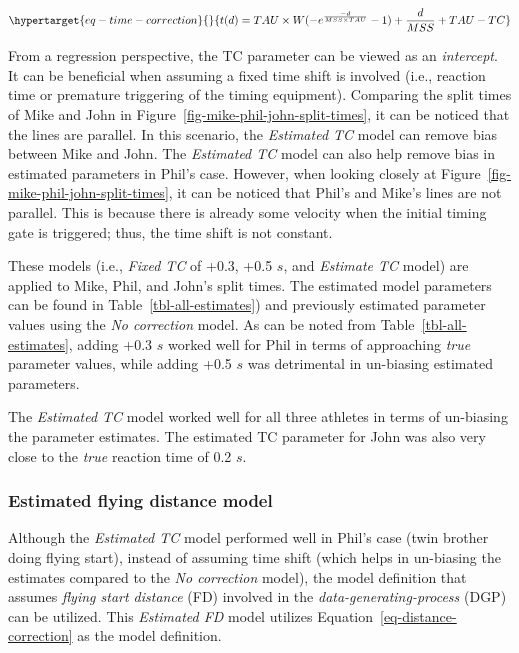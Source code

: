 \documentclass[
  letterpaper,
  DIV=11,
  numbers=noendperiod]{scrartcl}
\begin{document}
\begin{equation}\protect\hypertarget{eq-time-correction}{}{
  t(d) = TAU \times W(-e^{\frac{-d}{MSS \times TAU}} - 1) + \frac{d}{MSS} + TAU - TC 
}\label{eq-time-correction}\end{equation}

From a regression perspective, the TC parameter can be viewed as an
\emph{intercept}. It can be beneficial when assuming a fixed time shift
is involved (i.e., reaction time or premature triggering of the timing
equipment). Comparing the split times of Mike and John in
Figure~\ref{fig-mike-phil-john-split-times}, it can be noticed that the
lines are parallel. In this scenario, the \emph{Estimated TC} model can
remove bias between Mike and John. The \emph{Estimated TC} model can
also help remove bias in estimated parameters in Phil's case. However,
when looking closely at Figure~\ref{fig-mike-phil-john-split-times}, it
can be noticed that Phil's and Mike's lines are not parallel. This is
because there is already some velocity when the initial timing gate is
triggered; thus, the time shift is not constant.

These models (i.e., \emph{Fixed TC} of +0.3, +0.5 \(s\), and
\emph{Estimate TC} model) are applied to Mike, Phil, and John's split
times. The estimated model parameters can be found in
Table~\ref{tbl-all-estimates}) and previously estimated parameter values
using the \emph{No correction} model. As can be noted from
Table~\ref{tbl-all-estimates}, adding +0.3 \(s\) worked well for Phil in
terms of approaching \emph{true} parameter values, while adding +0.5
\(s\) was detrimental in un-biasing estimated parameters.

The \emph{Estimated TC} model worked well for all three athletes in
terms of un-biasing the parameter estimates. The estimated TC parameter
for John was also very close to the \emph{true} reaction time of 0.2
\(s\).

\hypertarget{estimated-flying-distance-model}{%
\subsubsection{Estimated flying distance
model}\label{estimated-flying-distance-model}}

Although the \emph{Estimated TC} model performed well in Phil's case
(twin brother doing flying start), instead of assuming time shift (which
helps in un-biasing the estimates compared to the \emph{No correction}
model), the model definition that assumes \emph{flying start distance}
(FD) involved in the \emph{data-generating-process} (DGP) can be
utilized. This \emph{Estimated FD} model utilizes
Equation~\ref{eq-distance-correction} as the model definition.
\end{document}
